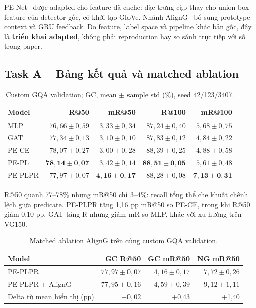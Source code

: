 PE-Net~\cite{zheng2023penet} được adapted cho feature đã cache:
đặc trưng cặp thay cho union-box feature của detector gốc, có khởi tạo GloVe.
Nhánh AlignG~\cite{jung2026aligng} bổ sung prototype context và GRU feedback.
Do feature, label space và pipeline khác bản gốc, đây là \textbf{triển khai
adapted}, không phải reproduction hay so sánh trực tiếp với số trong paper.


\clearpage
\subsection{Task A -- Bảng kết quả và matched ablation}
\begin{table}[H]\centering\small
\caption{Custom GQA validation; GC, mean $\pm$ sample std (\%), seed 42/123/3407.}\label{tab:gqa}
\begin{tabular}{@{}lrrrr@{}}\toprule
Model & R@50 & mR@50 & R@100 & mR@100\\\midrule
MLP & $76,66\pm0,59$ & $3,33\pm0,34$ & $87,24\pm0,40$ & $5,68\pm0,75$\\
GAT & $77,34\pm0,13$ & $3,10\pm0,10$ & $87,83\pm0,12$ & $4,84\pm0,22$\\
PE-CE & $78,07\pm0,27$ & $3,00\pm0,28$ & $88,39\pm0,25$ & $4,88\pm0,58$\\
PE-PL & $\mathbf{78,14\pm0,07}$ & $3,42\pm0,14$ & $\mathbf{88,51\pm0,05}$ & $5,61\pm0,48$\\
PE-PLPR & $77,97\pm0,07$ & $\mathbf{4,16\pm0,17}$ & $88,28\pm0,08$ & $\mathbf{7,13\pm0,31}$\\
\bottomrule\end{tabular}\end{table}

R@50 quanh 77--78\% nhưng mR@50 chỉ 3--4\%: recall tổng thể che khuất chênh lệch
giữa predicate. PE-PLPR tăng 1,16 pp mR@50 so PE-CE, trong khi R@50
giảm 0,10 pp. GAT tăng R nhưng giảm mR so MLP, khác với xu hướng trên VG150.

\begin{table}[H]\centering\small
\caption{Matched ablation AlignG trên cùng custom GQA validation.}\label{tab:aligng}
\begin{tabular}{@{}lrrr@{}}\toprule
Model & GC R@50 & GC mR@50 & NG mR@50\\\midrule
PE-PLPR & $77,97\pm0,07$ & $4,16\pm0,17$ & $7,72\pm0,26$\\
PE-PLPR + AlignG & $77,95\pm0,16$ & $4,59\pm0,39$ & $9,12\pm1,11$\\
Delta từ mean hiển thị (pp) & $-0,02$ & +0,43 & +1,40\\
\bottomrule\end{tabular}\end{table}

